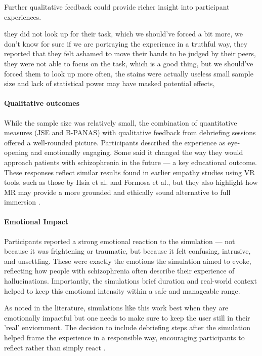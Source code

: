 Further qualitative feedback could provide richer insight into participant experiences.


they did not look up for their task, which we should've forced a bit more,
we don't know for sure if we are portraying the experience in a truthful way,
they reported that they felt ashamed to move their hands to be judged by their peers,
they were not able to focus on the task, which is a good thing, but we should've forced them to look up more often,
the stains were actually useless
small sample size and lack of statistical power may have masked potential effects,


\paragraph{Qualitative outcomes}
While the sample size was relatively small, the combination of quantitative measures (JSE and B-PANAS) with qualitative feedback from debriefing sessions offered a well-rounded picture. Participants described the experience as eye-opening and emotionally engaging. Some said it changed the way they would approach patients with schizophrenia in the future — a key educational outcome.
\vspace{1em}
These responses reflect similar results found in earlier empathy studies using VR tools, such as those by Hsia et al. and Formosa et al., but they also highlight how MR may provide a more grounded and ethically sound alternative to full immersion \cite{Hsia2022, Formosa2018}.

\paragraph{Emotional Impact}

Participants reported a strong emotional reaction to the simulation — not because it was frightening or traumatic, but because it felt confusing, intrusive, and unsettling. These were exactly the emotions the simulation aimed to evoke, reflecting how people with schizophrenia often describe their experience of hallucinations. Importantly, the simulations brief duration and real-world context helped to keep this emotional intensity within a safe and manageable range.

\vspace{1em}

As noted in the literature, simulations like this work best when they are emotionally impactful but one needs to make sure to keep the user still in their 'real' enviornment. The decision to include debriefing steps after the simulation helped frame the experience in a responsible way, encouraging participants to reflect rather than simply react \cite{Rueda2020, Ando2011}.

